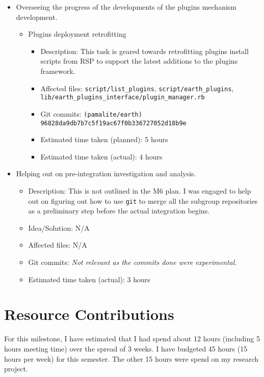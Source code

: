 \begin{itemize}
    \item Overseeing the progress of the developments of the plugins mechanism development.
        \begin{itemize}
            \item Plugins deployment retrofitting
                \begin{itemize}
                    \item Description: This task is geared towards retrofitting plugins install scripts from RSP to support the latest additions to the plugins framework.
                    \item Affected files: \texttt{script/list\_plugins}, \texttt{script/earth\_plugins}, \\ \texttt{lib/earth\_plugins\_interface/plugin\_manager.rb}
                    \item Git commits: \texttt{(pamalite/earth) 96828da9db7b7c5f19ac67f0b336727052d18b9e}
                    \item Estimated time taken (planned): 5 hours
                    \item Estimated time taken (actual): 4 hours
                \end{itemize}
        \end{itemize}
    \item Helping out on pre-integration investigation and analysis.
        \begin{itemize}
            \item Description: This is not outlined in the M6 plan. I was engaged to help out on figuring out how to use \texttt{git} to merge all the subgroup repositories as a preliminary step before the actual integration begins. 
	         \item Idea/Solution: N/A
	         \item Affected files: N/A
	         \item Git commits: \textit{Not relevant as the commits done were experimental.}
	         \item Estimated time taken (actual): 3 hours
	     \end{itemize}
\end{itemize}

\section*{Resource Contributions}

For this milestone, I have estimated that I had spend about 12 hours (including 5 hours meeting time) over the spread of 3 weeks. I have budgeted 45 hours (15 hours per week) for this semester. The other 15 hours were spend on my research project. 

